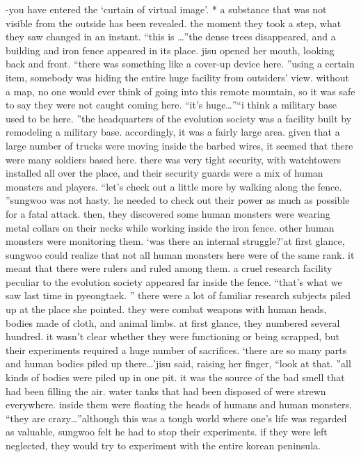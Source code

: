 -you have entered the ‘curtain of virtual image’.
* a substance that was not visible from the outside has been revealed.
the moment they took a step, what they saw changed in an instant.
“this is …”the dense trees disappeared, and a building and iron fence appeared in its place.
jisu opened her mouth, looking back and front.
“there was something like a cover-up device here.
”using a certain item, somebody was hiding the entire huge facility from outsiders’ view.
without a map, no one would ever think of going into this remote mountain, so it was safe to say they were not caught coming here.
“it’s huge…”“i think a military base used to be here.
”the headquarters of the evolution society was a facility built by remodeling a military base.
 accordingly, it was a fairly large area.
given that a large number of trucks were moving inside the barbed wires, it seemed that there were many soldiers based here.
 there was very tight security, with watchtowers installed all over the place, and their security guards were a mix of human monsters and players.
“let’s check out a little more by walking along the fence.
”sungwoo was not hasty.
 he needed to check out their power as much as possible for a fatal attack.
 then, they discovered some human monsters were wearing metal collars on their necks while working inside the iron fence.
 other human monsters were monitoring them.
‘was there an internal struggle?’at first glance, sungwoo could realize that not all human monsters here were of the same rank.
 it meant that there were rulers and ruled among them.
a cruel research facility peculiar to the evolution society appeared far inside the fence.
“that’s what we saw last time in pyeongtaek.
”
there were a lot of familiar research subjects piled up at the place she pointed.
 they were combat weapons with human heads, bodies made of cloth, and animal limbs.
at first glance, they numbered several hundred.
 it wasn’t clear whether they were functioning or being scrapped, but their experiments required a huge number of sacrifices.
‘there are so many parts and human bodies piled up there…’jisu said, raising her finger, “look at that.
”all kinds of bodies were piled up in one pit.
 it was the source of the bad smell that had been filling the air.
water tanks that had been disposed of were strewn everywhere.
 inside them were floating the heads of humans and human monsters.
“they are crazy…”although this was a tough world where one’s life was regarded as valuable, sungwoo felt he had to stop their experiments.
 if they were left neglected, they would try to experiment with the entire korean peninsula.

